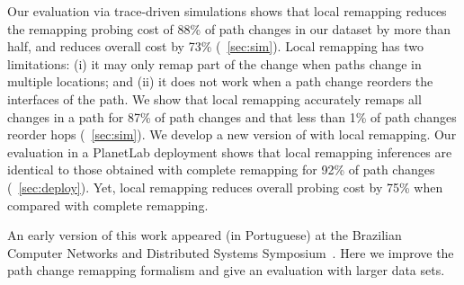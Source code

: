Our evaluation via trace-driven simulations shows that local remapping
reduces the remapping probing cost of 88\% of path changes in our dataset by
more than half, and reduces overall cost by 73\% (\secstr~\ref{sec:sim}).
Local remapping has two  limitations: (i) it may only remap part of the
change when paths change in multiple locations; and (ii)  it does not
work when a path change reorders the interfaces of the path.  We show
that local remapping accurately remaps all changes in a path for 87\%
of path changes and that less than 1\% of path changes reorder hops
(\secstr~\ref{sec:sim}).  We develop a new version of \dtrack{} with
local remapping.  Our evaluation in a PlanetLab deployment shows that
local remapping inferences are identical to those obtained with complete
remapping for 92\% of path changes (\secstr~\ref{sec:deploy}). Yet,
local remapping reduces overall probing cost by 75\% when compared with
complete remapping.

An early version of this work appeared (in Portuguese) at the Brazilian
Computer Networks and Distributed Systems Symposium~\cite{cunha13remap}.
Here we improve the path change remapping formalism and give an
evaluation with larger data sets.


%

